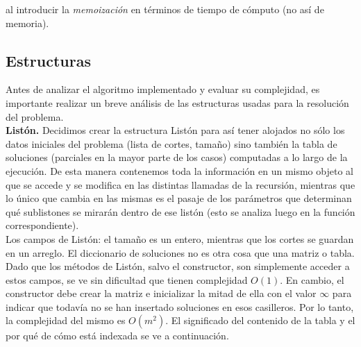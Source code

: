 al introducir la \textsl{memoización} en términos de tiempo de cómputo (no así de memoria).

\subsection{Estructuras}

Antes de analizar el algoritmo implementado y evaluar su complejidad, es importante realizar un breve análisis de las estructuras usadas para la resolución del problema.\\

\textbf{Listón.} Decidimos crear la estructura Listón para así tener alojados no sólo los datos iniciales del problema (lista de cortes, tamaño) sino también la tabla de soluciones (parciales en la mayor parte de los casos) computadas a lo largo de la ejecución. De esta manera contenemos toda la información en un mismo objeto al que se accede y se modifica en las distintas llamadas de la recursión, mientras que lo único que cambia en las mismas es el pasaje de los parámetros que determinan qué sublistones se mirarán dentro de ese listón (esto se analiza luego en la función correspondiente).\\
\indent Los campos de Listón: el tamaño es un entero, mientras que los cortes se guardan en un arreglo. El diccionario de soluciones no es otra cosa que una matriz o tabla. Dado que los métodos de Listón, salvo el constructor, son simplemente acceder a estos campos, se ve sin dificultad que tienen complejidad $O(1)$. En cambio, el constructor debe crear la matriz e inicializar la mitad de ella con el valor $\infty$ para indicar que todavía no se han insertado soluciones en esos casilleros. Por lo tanto, la complejidad del mismo es $O(m^2)$. El significado del contenido de la tabla y el por qué de cómo está indexada se ve a continuación.\\

